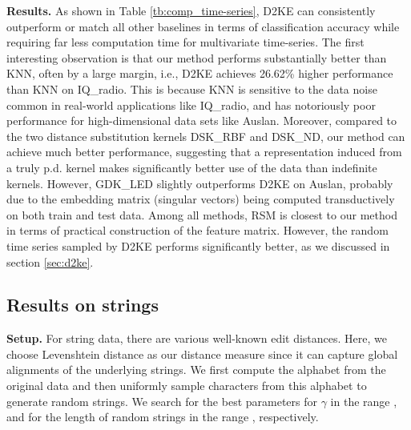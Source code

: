 \documentclass{article}
\newcommand{\1}{\mathbf{1}}
\begin{document}
\textbf{Results.} As shown in Table \ref{tb:comp_time-series}, D2KE can consistently outperform or match all other baselines in terms of classification accuracy while requiring far less computation time for multivariate time-series. The first interesting observation is that  our method performs substantially better than KNN, often by a large margin, i.e., D2KE achieves 26.62\% higher performance than KNN on IQ\_radio. This is because KNN is sensitive to the data noise common in real-world applications like IQ\_radio, and has notoriously poor performance for high-dimensional data sets like Auslan. Moreover, compared to the two distance substitution kernels DSK\_RBF and DSK\_ND, our method can achieve much better performance, suggesting that a representation induced from a truly p.d. kernel makes significantly better use of the data than indefinite kernels. However, GDK\_LED slightly outperforms D2KE on Auslan, probably due to the embedding matrix (singular vectors) being computed transductively on both train and test data. Among all methods, RSM is closest to our method in terms of practical construction of the feature matrix. However, the random time series sampled by D2KE performs significantly better, as we discussed in section \ref{sec:d2ke}. 


\subsection{Results on strings }
\label{App:Results on strings}
\textbf{Setup.} For string data, there are various well-known edit distances. Here, we choose Levenshtein distance as our distance measure since it can capture global alignments of the underlying strings. We first compute the alphabet from the original data and then uniformly sample characters from this alphabet to generate random strings. We search for the best parameters for  $\gamma$ in the range \text{[1e-5 1]}, and for the length of random strings in the range \text{[2 50]}, respectively.  
\end{document}
